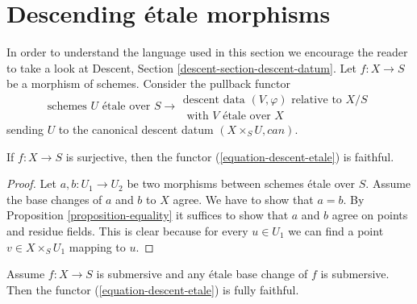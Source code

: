 \section{Descending \'etale morphisms}
\label{section-descending-etale}

\noindent
In order to understand the language used in this section we encourage
the reader to take a look at
Descent, Section \ref{descent-section-descent-datum}.
Let $f : X \to S$ be a morphism of schemes. Consider the
pullback functor
\begin{equation}
\label{equation-descent-etale}
\text{schemes }U\text{ \'etale over }S \longrightarrow
\begin{matrix}
\text{descent data }(V, \varphi)\text{ relative to }X/S \\
\text{ with }V\text{ \'etale over }X
\end{matrix}
\end{equation}
sending $U$ to the canonical descent datum $(X \times_S U, can)$.

\begin{lemma}
\label{lemma-faithful}
If $f : X \to S$ is surjective, then the functor
(\ref{equation-descent-etale}) is faithful.
\end{lemma}

\begin{proof}
Let $a, b : U_1 \to U_2$ be two morphisms between schemes \'etale over $S$.
Assume the base changes of $a$ and $b$ to $X$ agree.
We have to show that $a = b$.
By Proposition \ref{proposition-equality} it suffices to
show that $a$ and $b$ agree on points and residue fields.
This is clear because for every $u \in U_1$ we can find a point
$v \in X \times_S U_1$ mapping to $u$.
\end{proof}

\begin{lemma}
\label{lemma-fully-faithful}
Assume $f : X \to S$ is submersive and any \'etale base change
of $f$ is submersive. Then the functor
(\ref{equation-descent-etale}) is fully faithful.
\end{lemma}

